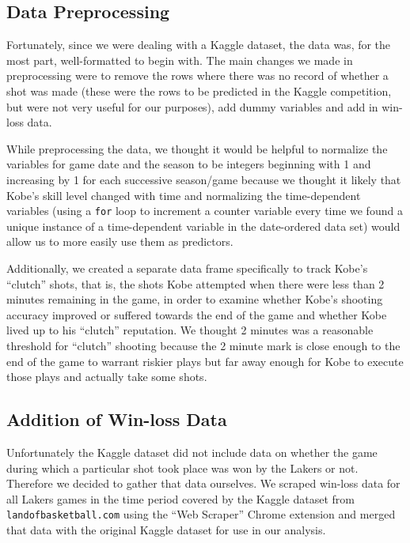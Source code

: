\documentclass[paper=a4, fontsize=11pt]{scrartcl} %
\numberwithin{equation}{section} %
\numberwithin{figure}{section} %
\numberwithin{table}{section} %
\begin{document}
	\subsection{Data Preprocessing}
	\hspace*{1cm}Fortunately, since we were dealing with a Kaggle dataset, the data was, for the most part, well-formatted to begin with. The main changes we made in preprocessing were to remove the rows where there was no record of whether a shot was made (these were the rows to be predicted in the Kaggle competition, but were not very useful for our purposes), add dummy variables and add in win-loss data.

	\hspace*{1cm}While preprocessing the data, we thought it would be helpful to normalize the variables for game date and the season to be integers beginning with 1 and increasing by 1 for each successive season/game because we thought it likely that Kobe's skill level changed with time and normalizing the time-dependent variables (using a \texttt{for} loop to increment a counter variable every time we found a unique instance of a time-dependent variable in the date-ordered data set) would allow us to more easily use them as predictors.

	\hspace*{1cm}Additionally, we created a separate data frame specifically to track Kobe's ``clutch'' shots, that is, the shots Kobe attempted when there were less than 2 minutes remaining in the game, in order to examine whether Kobe's shooting accuracy improved or suffered towards the end of the game and whether Kobe lived up to his ``clutch'' reputation. We thought 2 minutes was a reasonable threshold for ``clutch'' shooting because the 2 minute mark is close enough to the end of the game to warrant riskier plays but far away enough for Kobe to execute those plays and actually take some shots. 
	\subsection{Addition of Win-loss Data}
	\hspace*{1cm}Unfortunately the Kaggle dataset did not include data on whether the game during which a particular shot took place was won by the Lakers or not. Therefore we decided to gather that data ourselves. We scraped win-loss data for all Lakers games in the time period covered by the Kaggle dataset from \texttt{landofbasketball.com} \cite{landofbasketball} using the ``Web Scraper'' Chrome extension and merged that data with the original Kaggle dataset for use in our analysis.
\end{document}
